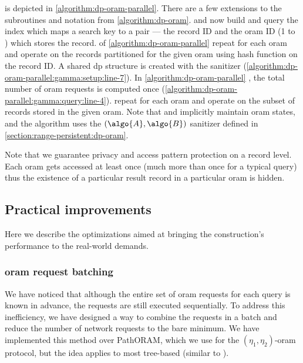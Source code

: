 		\protocolGamma{} is depicted in \cref{algorithm:dp-oram-parallel}.
		There are a few extensions to the subroutines and notation from \cref{algorithm:dp-oram}.
		 and  now build and query the index which maps a search key to a pair --- the record ID and the \acrshort{oram} ID (1 to \oramsNumber{}) which stores the record.
		 of \cref{algorithm:dp-oram-parallel} \protocolSetup{} repeat for each \acrshort{oram} and operate on the records partitioned for the given \acrshort{oram} using hash function  on the record ID\@.
		A shared \acrshort{dp} structure is created with the sanitizer  (\cref{algorithm:dp-oram-parallel:gamma:setup:line-7}).
		In \cref{algorithm:dp-oram-parallel} \protocolQuery{}, the total number of \acrshort{oram} requests is computed once (\cref{algorithm:dp-oram-parallel:gamma:query:line-4}).
		 repeat for each \acrshort{oram} and operate on the subset of records stored in the given \acrshort{oram}.
		Note that \user{} and \server{} implicitly maintain \oramsNumber{} \acrshort{oram} states, and the algorithm uses the $(\algo{A}, \algo{B})$ sanitizer defined in \cref{section:range-persistent:dp-oram}.

		Note that we guarantee privacy and access pattern protection on a record level.
		Each \acrshort{oram} gets accessed at least once (much more than once for a typical query) thus the existence of a particular result record in a particular \acrshort{oram} is hidden.

	\subsection{Practical improvements}\label{section:range-persistent:dp-improvements}

		Here we describe the optimizations aimed at bringing the construction's performance to the real-world demands.

		\subsubsection{\acrshort{oram} request batching}\label{section:range-persistent:dp-improvements:oram-batching}

			We have noticed that although the entire set of \acrshort{oram} requests for each query is known in advance, the requests are still executed sequentially.
			To address this inefficiency, we have designed a way to combine the requests in a batch and reduce the number of network requests to the bare minimum.
			We have implemented this method over PathORAM, which we use for the $(\eta_1, \eta_2)$-\acrshort{oram} protocol, but the idea applies to most tree-based  (similar to \cite{parallel-oram-improved}).

